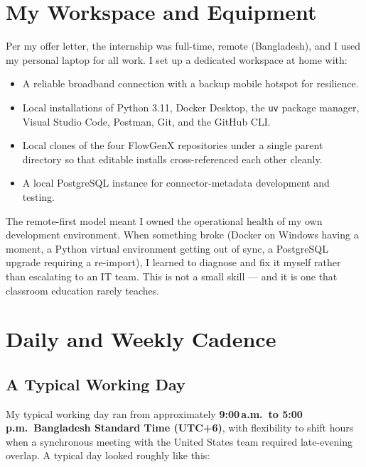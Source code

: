 \section{My Workspace and Equipment}
Per my offer letter, the internship was full-time, remote
(Bangladesh), and I used my personal laptop for all work. I set up
a dedicated workspace at home with:

\begin{itemize}[leftmargin=*]
    \item A reliable broadband connection with a backup mobile
    hotspot for resilience.
    \item Local installations of Python 3.11, Docker Desktop, the
    \texttt{uv} package manager, Visual Studio Code, Postman, Git,
    and the GitHub CLI.
    \item Local clones of the four FlowGenX repositories under a
    single parent directory so that editable installs cross-referenced
    each other cleanly.
    \item A local PostgreSQL instance for connector-metadata
    development and testing.
\end{itemize}

The remote-first model meant I owned the operational health of my
own development environment. When something broke (Docker on Windows
having a moment, a Python virtual environment getting out of sync,
a PostgreSQL upgrade requiring a re-import), I learned to diagnose
and fix it myself rather than escalating to an IT team. This is not
a small skill --- and it is one that classroom education rarely
teaches.

\section{Daily and Weekly Cadence}
\subsection{A Typical Working Day}
My typical working day ran from approximately
\textbf{9:00\,a.m.\ to 5:00\,p.m.\ Bangladesh Standard Time
(UTC+6)}, with flexibility to shift hours when a synchronous meeting
with the United States team required late-evening overlap. A typical
day looked roughly like this:

